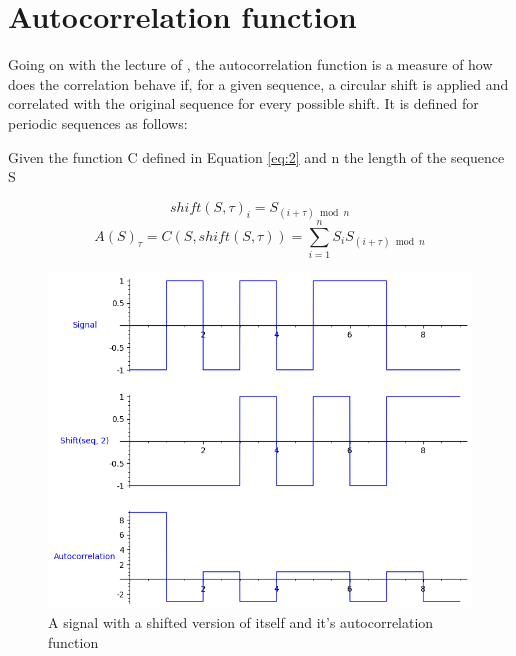 \section{Autocorrelation function}

Going on with the lecture of \citet{golomb_ref}, the autocorrelation function
is a measure of how does the correlation behave if, for a given sequence, a
circular shift is applied and correlated with the original sequence for every
possible shift. It is defined for periodic sequences as follows:

\begin{definition}[Autocorrelation]\label{def:3}

Given the function C defined in Equation \ref{eq:2} and n the length of the
sequence S

\begin{equation}\label{eq:3}
  shift(S, \tau)_i = S_{(i+\tau) \bmod n}
\end{equation}
\begin{equation}\label{eq:4}
  A(S)_{\tau} = C(S, shift(S, \tau)) = \sum_{i=1}^{n}S_{i}S_{(i+\tau) \bmod n}
\end{equation}

\end{definition}

\begin{figure}[ht!] %
\begin{center}
\includegraphics[width=0.7\linewidth]{Chapters/Introduction/signals_autocorrelation}
\end{center}
\caption{A signal with a shifted version of itself and it's autocorrelation function}
\label{introduction_signals_autocorrelation}
\end{figure}

